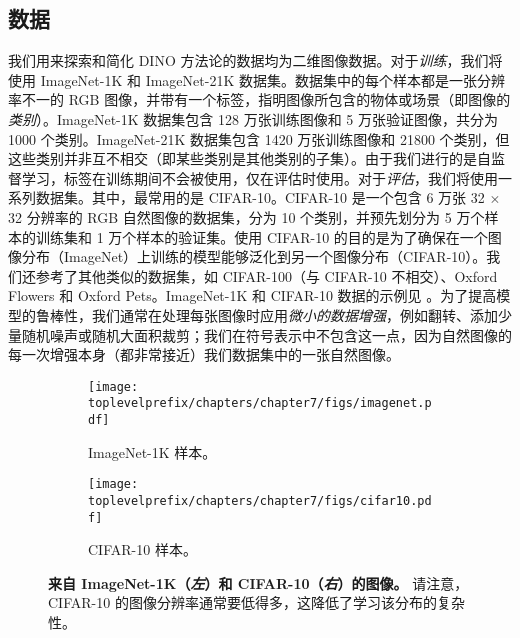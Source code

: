 \documentclass[../../book-main.tex]{subfiles}
\begin{document}
\subsection{数据}\label{sub:contrastive_learning_data}

我们用来探索和简化 DINO 方法论的数据均为二维图像数据。对于\textit{训练}，我们将使用 ImageNet-1K 和 ImageNet-21K 数据集。数据集中的每个样本都是一张分辨率不一的 RGB 图像，并带有一个标签，指明图像所包含的物体或场景（即图像的\textit{类别}）。ImageNet-1K 数据集包含 128 万张训练图像和 5 万张验证图像，共分为 1000 个类别。ImageNet-21K 数据集包含 1420 万张训练图像和 21800 个类别，但这些类别并非互不相交（即某些类别是其他类别的子集）。由于我们进行的是自监督学习，标签在训练期间不会被使用，仅在评估时使用。对于\textit{评估}，我们将使用一系列数据集。其中，最常用的是 CIFAR-10。CIFAR-10 是一个包含 6 万张 32 \(\times\) 32 分辨率的 RGB 自然图像的数据集，分为 10 个类别，并预先划分为 5 万个样本的训练集和 1 万个样本的验证集。使用 CIFAR-10 的目的是为了确保在一个图像分布（ImageNet）上训练的模型能够泛化到另一个图像分布（CIFAR-10）。我们还参考了其他类似的数据集，如 CIFAR-100（与 CIFAR-10 不相交）、Oxford Flowers 和 Oxford Pets。ImageNet-1K 和 CIFAR-10 数据的示例见 。为了提高模型的鲁棒性，我们通常在处理每张图像时应用\textit{微小的数据增强}，例如翻转、添加少量随机噪声或随机大面积裁剪；我们在符号表示中不包含这一点，因为自然图像的每一次增强本身（都非常接近）我们数据集中的一张自然图像。

\begin{figure}
    \centering
    
    \hfill 
    \begin{subfigure}{0.3\textwidth}
        \centering 
        \texttt{[image: \\toplevelprefix/chapters/chapter7/figs/imagenet.pdf]}
        \caption{\small ImageNet-1K 样本。}
    \end{subfigure}
    \hfill 
    \begin{subfigure}{0.26\textwidth}
        \centering 
        \texttt{[image: \\toplevelprefix/chapters/chapter7/figs/cifar10.pdf]}
        \caption{\small CIFAR-10 样本。}
    \end{subfigure}
    \hfill 
    \phantom{}

    \caption{\small\textbf{来自 ImageNet-1K（\textit{左}）和 CIFAR-10（\textit{右}）的图像。} 请注意，CIFAR-10 的图像分辨率通常要低得多，这降低了学习该分布的复杂性。}
    \label{fig:in1k_cifar10_examples}
\end{figure}
\end{document}
